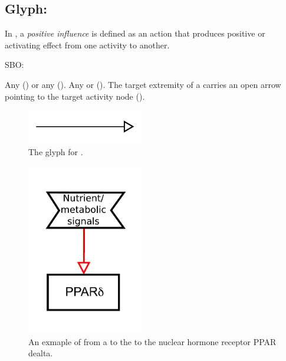 \subsection{Glyph: }
\label{sec:af:positive_infl}

In \SBGNAFLone, a \emph{positive influence} is defined as an action that produces positive or activating effect from one activity to another.   

\begin{glyphDescription}

\glyphSboTerm SBO:

 \glyphOrigin Any  () or any  ().
 \glyphTarget Any  or  ().
 \glyphEndPoint The target extremity of a  carries an open arrow pointing to the target activity node ().


\end{glyphDescription}

\begin{figure}[H]
  \centering
  \includegraphics[width = 2in]{images/positiveInfluence}
  \caption{The \AF glyph for .}
  \label{fig:af:positiveInfl}
\end{figure}


\begin{figure}[H]
  \centering
  \includegraphics[width = 2in]{examples/ex-positiveInfluence}
  \caption{An exmaple of  from a  to the to the nuclear hormone receptor PPAR dealta.}
  \label{fig:af:exPI}
\end{figure}